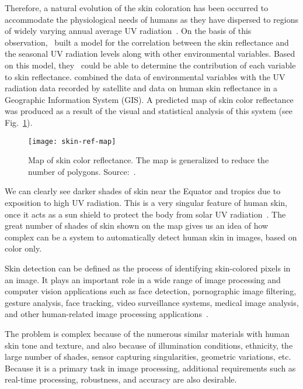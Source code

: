 Therefore, a natural evolution of the skin coloration has been occurred to accommodate the physiological needs of humans as they have dispersed to regions of widely varying annual average UV radiation~\citep{jablonski:10}. On the basis of this observation,~\citet{chaplin:04} built a model for the correlation between the skin reflectance and the seasonal UV radiation levels along with other environmental variables. Based on this model, they~\citep{chaplin:04} could be able to determine the contribution of each variable to skin reflectance. \citet{chaplin:04} combined the data of environmental variables with the UV radiation data recorded by satellite and data on human skin reflectance in a Geographic Information System (GIS). A predicted map of skin color reflectance was produced as a result of the visual and statistical analysis of this system (see Fig.~\ref{fig:skin-ref-map}).


\begin{figure}[!hb]
  \centering
  \texttt{[image: skin-ref-map]}
  \caption[Map of skin color reflectance]{Map of skin color reflectance. The map is generalized to reduce the number of polygons. Source:~\citet{chaplin:04}.}
  \label{fig:skin-ref-map}
\end{figure}

We can clearly see darker shades of skin near the Equator and tropics due to exposition to high UV radiation. This is a very singular feature of human skin, once it acts as a sun shield to protect the body from solar UV radiation~\citep{jablonski:04}. The great number of shades of skin shown on the map gives us an idea of how complex can be a system to automatically detect human skin in images, based on color only.

Skin detection can be defined as the process of identifying skin-colored pixels in an image. It plays an important role in a wide range of image processing and computer vision applications such as face detection, pornographic image filtering, gesture analysis, face tracking, video surveillance systems, medical image analysis, and other human-related image processing applications~\citep{kakumanu:07}.

The problem is complex because of the numerous similar materials with human skin tone and texture, and also because of illumination conditions, ethnicity, the large number of shades, sensor capturing singularities, geometric variations, etc. Because it is a primary task in image processing, additional requirements such as real-time processing, robustness, and accuracy are also desirable.

